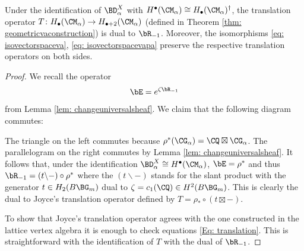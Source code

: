 \begin{lemma}
\notready\label{lem: translationdualr-1}
Under the identification of $\BD^X_\alpha$ with $H^\bullet(\CM_\alpha)\cong H_\bullet(\CM_\alpha) ^\dagger$, the translation operator $T\colon H_\bullet(\CM_\alpha)\to H_{\bullet+2}(\CM_\alpha)$ (defined in Theorem \ref{thm: geometricvaconstruction}) is dual to $\bR_{-1}$. Moreover, the isomorphisms \eqref{eq: isovectorspaceva}, \eqref{eq: isovectorspacevapa} preserve the respective translation operators on both sides.
\end{lemma}
\begin{proof}
We recall the operator
\[\bE=e^{\zeta \bR_{-1}}\] from Lemma \ref{lem: changeuniversalsheaf}. We claim that the following diagram commutes:


The triangle on the left commutes because $\rho^*(\CG_\alpha) = \CQ\boxtimes \CG_\alpha$. The parallelogram on the right commutes by Lemma \ref{lem: changeuniversalsheaf}. It follows that, under the identification $\BD^X_\alpha\cong H^\bullet(\CM_\alpha)$, $\bE=\rho^\ast$ and thus $\bR_{-1}=(t\backslash-)\circ \rho^\ast$ where the $(t\backslash -)$ stands for the slant product with the generator $t\in H_2(B\BG_m)$ dual to $\zeta=c_1(\CQ)\in H^2(B\BG_m)$. This is clearly the dual to Joyce's translation operator defined by $T=\rho_\ast\circ (t\boxtimes -).$

To show that Joyce's translation operator agrees with the one constructed in the lattice vertex algebra it is enough to check equations \eqref{Eq: translation}. This is straightforward with the identification of $T$ with the dual of $\bR_{-1}$.
\end{proof}

